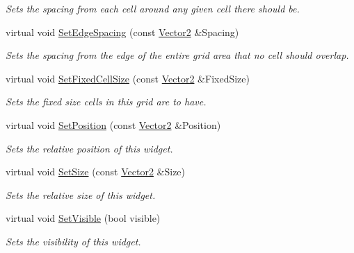 \begin{DoxyCompactItemize}
\begin{DoxyCompactList}\small\item\em Sets the spacing from each cell around any given cell there should be. \item\end{DoxyCompactList}\item 
virtual void \hyperlink{classphys_1_1UI_1_1CellGrid_aa55c328e2d222570d5c72bb50a48f8a5}{SetEdgeSpacing} (const \hyperlink{classphys_1_1Vector2}{Vector2} \&Spacing)
\begin{DoxyCompactList}\small\item\em Sets the spacing from the edge of the entire grid area that no cell should overlap. \item\end{DoxyCompactList}\item 
virtual void \hyperlink{classphys_1_1UI_1_1CellGrid_ad8a6d111b1906b0eb165fcedc0917452}{SetFixedCellSize} (const \hyperlink{classphys_1_1Vector2}{Vector2} \&FixedSize)
\begin{DoxyCompactList}\small\item\em Sets the fixed size cells in this grid are to have. \item\end{DoxyCompactList}\item 
virtual void \hyperlink{classphys_1_1UI_1_1CellGrid_abf0552ebbe369f6b695f91fdaa220c20}{SetPosition} (const \hyperlink{classphys_1_1Vector2}{Vector2} \&Position)
\begin{DoxyCompactList}\small\item\em Sets the relative position of this widget. \item\end{DoxyCompactList}\item 
virtual void \hyperlink{classphys_1_1UI_1_1CellGrid_a83de47589cb02ce49882f795e9281f57}{SetSize} (const \hyperlink{classphys_1_1Vector2}{Vector2} \&Size)
\begin{DoxyCompactList}\small\item\em Sets the relative size of this widget. \item\end{DoxyCompactList}\item 
virtual void \hyperlink{classphys_1_1UI_1_1CellGrid_abd1b3b422680a8b549c1c897b300da5d}{SetVisible} (bool visible)
\begin{DoxyCompactList}\small\item\em Sets the visibility of this widget. \item\end{DoxyCompactList}\item 

\end{DoxyCompactItemize}
